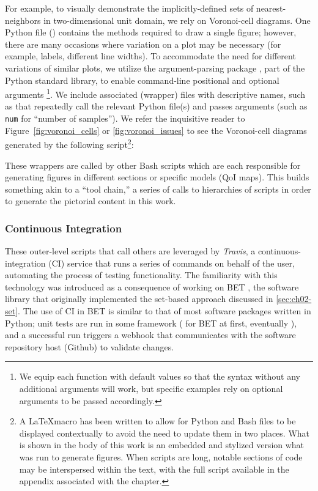 For example, to visually demonstrate the implicitly-defined sets of nearest-neighbors in two-dimensional unit domain, we rely on Voronoi-cell diagrams.
One Python file () contains the methods required to draw a single figure; however, there are many occasions where variation on a plot may be necessary (for example, labels, different line widths).
To accommodate the need for different variations of similar plots, we utilize the argument-parsing package , part of the Python standard library, to enable command-line positional and optional arguments \footnote{We equip each function with default values so that the syntax  without any additional arguments will work, but specific examples rely on optional arguments to be passed accordingly.}.
We include associated (wrapper) files with descriptive names, such as  that repeatedly call the relevant Python file(s) and passes arguments (such as {\tt num} for ``number of samples'').
We refer the inquisitive reader to  Figure~\ref{fig:voronoi_cells} or \ref{fig:voronoi_issues} to see the Voronoi-cell diagrams generated by the following script\footnote{A \LaTeX macro has been written to allow for Python and Bash files to be displayed contextually to avoid the need to update them in two places. What is shown in the body of this work is an embedded and stylized version what was run to generate figures. When scripts are long, notable sections of code may be interspersed within the text, with the full script available in the appendix associated with the chapter.}:



These wrappers are called by other Bash scripts which are each responsible for generating figures in different sections or specific models (QoI maps).
This builds something akin to a ``tool chain,'' a series of calls to hierarchies of scripts in order to generate the pictorial content in this work.



\subsubsection{Continuous Integration}\label{sec:continuous-integration}

These outer-level scripts that call others are leveraged by \emph{Travis}, a continuous-integration (CI) service that runs a series of commands on behalf of the user, automating the process of testing functionality.
The familiarity with this technology was introduced as a consequence of working on BET \cite{pyBET}, the software library that originally implemented the set-based approach discussed in \ref{sec:ch02-set}.
The use of CI in BET is similar to that of most software packages written in Python; unit tests are run in some framework ( for BET at first, eventually ), and a successful run triggers a webhook that communicates with the software repository host (Github) to validate changes.

